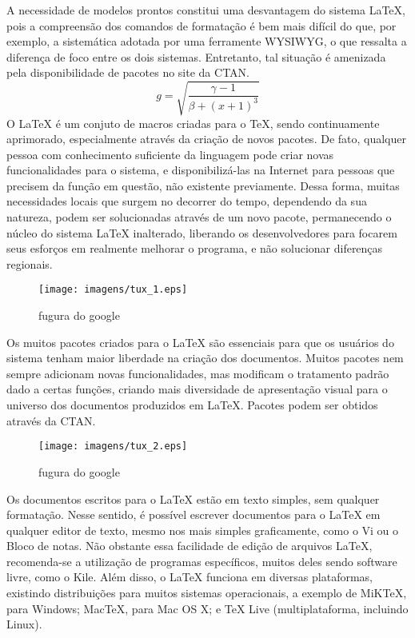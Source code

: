 \documentclass[twocolumn,10pt]{article}
\begin{document}
%
A necessidade de modelos prontos constitui uma desvantagem do sistema LaTeX, pois a compreensão dos comandos de formatação é bem mais difícil do que, por exemplo, a sistemática adotada por uma ferramente WYSIWYG, o que ressalta a diferença de foco entre os dois sistemas. Entretanto, tal situação é amenizada pela disponibilidade de pacotes no site da CTAN.
%
\begin{equation}
  \label{eq:raiz}
  g = \sqrt{\frac{\gamma - 1}{\beta + (x+1)^3}}
\end{equation}
%
O LaTeX é um conjuto de macros criadas para o TeX, sendo continuamente aprimorado, especialmente através da criação de novos pacotes. De fato, qualquer pessoa com conhecimento suficiente da linguagem pode criar novas funcionalidades para o sistema, e disponibilizá-las na Internet para pessoas que precisem da função em questão, não existente previamente. Dessa forma, muitas necessidades locais que surgem no decorrer do tempo, dependendo da sua natureza, podem ser solucionadas através de um novo pacote, permanecendo o núcleo do sistema LaTeX inalterado, liberando os desenvolvedores para focarem seus esforços em realmente melhorar o programa, e não solucionar diferenças regionais.
%
\begin{figure}[t]
  \centering
  \texttt{[image: imagens/tux\_1.eps]}
  \caption{fugura do google}
\end{figure}
%
Os muitos pacotes criados para o LaTeX são essenciais para que os usuários do sistema tenham maior liberdade na criação dos documentos. Muitos pacotes nem sempre adicionam novas funcionalidades, mas modificam o tratamento padrão dado a certas funções, criando mais diversidade de apresentação visual para o universo dos documentos produzidos em LaTeX. Pacotes podem ser obtidos através da CTAN.
%
\begin{figure}[t]
  \centering
  \texttt{[image: imagens/tux\_2.eps]}
  \caption{fugura do google} %
\label{fig:teste_1} %
\end{figure}
%
Os documentos escritos para o LaTeX estão em texto simples, sem qualquer formatação. Nesse sentido, é possível escrever documentos para o LaTeX em qualquer editor de texto, mesmo nos mais simples graficamente, como o Vi ou o Bloco de notas. Não obstante essa facilidade de edição de arquivos LaTeX, recomenda-se a utilização de programas específicos, muitos deles sendo software livre, como o Kile. Além disso, o LaTeX funciona em diversas plataformas, existindo distribuições para muitos sistemas operacionais, a exemplo de MiKTeX, para Windows; MacTeX, para Mac OS X; e TeX Live (multiplataforma, incluindo Linux).
\end{document}
